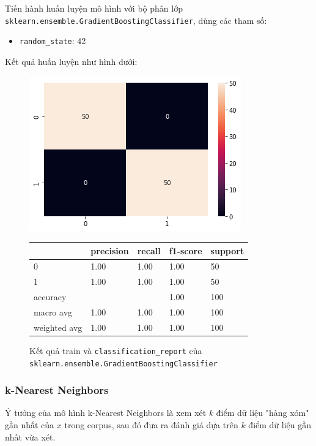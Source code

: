 \documentclass[12pt]{article}
\begin{document}
Tiến hành huấn luyện mô hình với bộ phân lớp \texttt{sklearn.ensemble.GradientBoostingClassifier}, dùng các tham số:
\begin{itemize}
\item \texttt{random\_state}: 42
\end{itemize}
Kết quả huấn luyện như hình dưới:
\begin{figure}[H]
	\begin{multicols}{2}
		\includegraphics[scale=.5]{img/train-gb-result.png}

		\begin{table}[H]
			\begin{tabular}{l l l l l}
				\hline
				& precision & recall & f1-score & support \\
				\hline
				0 & 1.00 & 1.00 & 1.00 & 50 \\
				1 & 1.00 & 1.00 & 1.00 & 50 \\
				accuracy &   &   & 1.00 & 100 \\
				macro avg & 1.00 & 1.00 & 1.00 & 100 \\
				weighted avg & 1.00 & 1.00 & 1.00 & 100 \\
				\hline
			\end{tabular}
		\end{table}
	\end{multicols}
	\caption{Kết quả train và \texttt{classification\_report} của \texttt{sklearn.ensemble.GradientBoostingClassifier}}
\end{figure}

\subsubsection{k-Nearest Neighbors}
Ý tưởng của mô hình k-Nearest Neighbors là xem xét $k$ điểm dữ liệu "hàng xóm" gần nhất của $x$ trong corpus, sau đó đưa ra đánh giá dựa trên $k$ điểm dữ liệu gần nhất vừa xét.\cite{Kowsari_2019}
\end{document}
